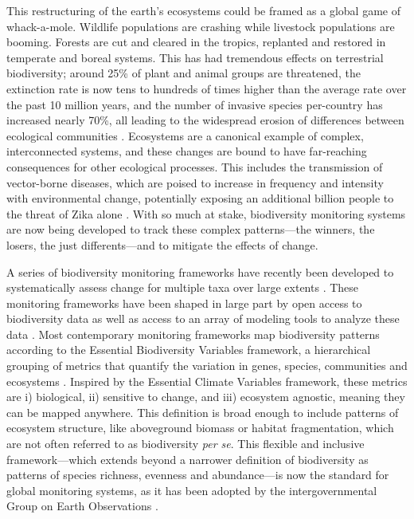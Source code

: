 This restructuring of the earth's ecosystems could be framed as a global game of whack-a-mole. Wildlife populations are crashing while livestock populations are booming. Forests are cut and cleared in the tropics, replanted and restored in temperate and boreal systems. This has had tremendous effects on terrestrial biodiversity; around 25\% of plant and animal groups are threatened, the extinction rate is now tens to hundreds of times higher than the average rate over the past 10 million years, and the number of invasive species per-country has increased nearly 70\%, all leading to the widespread erosion of differences between ecological communities \cite{IPBES2019-hl}. Ecosystems are a canonical example of complex, interconnected systems, and these changes are bound to have far-reaching consequences for other ecological processes. This includes the transmission of vector-borne diseases, which are poised to increase in frequency and intensity with environmental change, potentially exposing an additional billion people to the threat of Zika alone \cite{Ryan2020-ay}. With so much at stake, biodiversity monitoring systems are now being developed to track these complex patterns—the winners, the losers, the just differents—and to mitigate the effects of change.

A series of biodiversity monitoring frameworks have recently been developed to systematically assess change for multiple taxa over large extents \cite{Scholes2012-ec,Fernandez2015-na}. These monitoring frameworks have been shaped in large part by open access to biodiversity data \cite{Kattge2011-tf, Jetz2012-mw, Metzger2013-mz, Culina2018-ih} as well as access to an array of modeling tools to analyze these data \cite{Butchart2010-we, Pettorelli2016-wi, Gorelick2017-nx}. Most contemporary monitoring frameworks map biodiversity patterns according to the Essential Biodiversity Variables framework, a hierarchical grouping of metrics that quantify the variation in genes, species, communities and ecosystems \cite{Pereira2013-pk}. Inspired by the Essential Climate Variables framework, these metrics are i) biological, ii) sensitive to change, and iii) ecosystem agnostic, meaning they can be mapped anywhere. This definition is broad enough to include patterns of ecosystem structure, like aboveground biomass or habitat fragmentation, which are not often referred to as biodiversity \textit{per se}. This flexible and inclusive framework—which extends beyond a narrower definition of biodiversity as patterns of species richness, evenness and abundance—is now the standard for global monitoring systems, as it has been adopted by the intergovernmental Group on Earth Observations \cite{Geo_bon2017-ak}.

